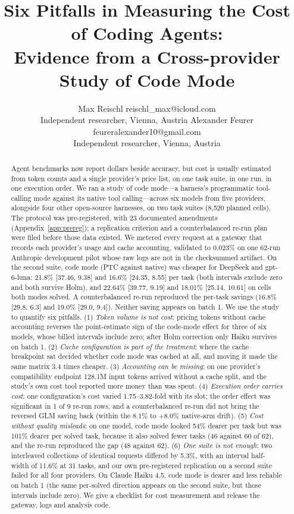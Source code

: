\documentclass[10pt]{article}
\title{Six Pitfalls in Measuring the Cost of Coding Agents:\\
Evidence from a Cross-provider Study of Code Mode}
\author{\name Max Reischl \email reischl\_max@icloud.com \\
      \addr Independent researcher, Vienna, Austria
      \AND
      \name Alexander Feurer \email feureralexander10@gmail.com \\
      \addr Independent researcher, Vienna, Austria}
\newcommand*{\mi}{\textminus}   %
\begin{document}
\maketitle

\begin{abstract}
Agent benchmarks now report dollars beside accuracy, but cost is usually estimated from
token counts and a single provider's price list, on one task suite, in one run, in one execution
order. We ran a study of code mode---a harness's programmatic tool-calling mode against its native
tool calling---across six models from five providers, alongside four other open-source harnesses, on
two task suites (8,520 planned cells). The protocol was pre-registered, with 23 documented amendments
(Appendix~\ref{app:prereg}); a replication criterion and a counterbalanced re-run plan were filed
before those data existed. We metered every request at a gateway that records each provider's usage
and cache accounting, validated to 0.023\% on one 62-run Anthropic development pilot whose raw logs
are not in the checksummed artifact.
On the second suite, code mode (PTC against native) was cheaper for DeepSeek and gpt-6-luna:
\mi{}21.8\% [\mi{}37.46, \mi{}9.38] and \mi{}16.6\% [\mi{}24.35, \mi{}8.55] per task
(both intervals exclude zero and both survive Holm), and \mi{}22.64\% [\mi{}39.77, \mi{}9.19] and
\mi{}18.01\% [\mi{}25.14, \mi{}10.61] on cells both modes solved. A counterbalanced re-run
reproduced the per-task savings (\mi{}16.8\% [\mi{}29.8, \mi{}6.3] and \mi{}19.0\% [\mi{}29.0, \mi{}9.4]).
Neither saving appears on batch 1. We use the study to quantify six
pitfalls. (1) \emph{Token volume is not cost}: pricing tokens without cache accounting reverses the
point-estimate sign of the code-mode effect for three of six models, whose billed intervals include zero; after Holm correction only Haiku survives on batch 1. (2) \emph{Cache configuration is part of the
treatment}: where the cache breakpoint sat decided whether code mode was cached at all, and moving it
made the same matrix 3.4 times cheaper. (3) \emph{Accounting can be missing}: on one provider's
compatibility endpoint 128.1M input tokens arrived without a cache split, and the study's own cost tool
reported more money than was spent. (4) \emph{Execution order carries cost}: one configuration's cost
varied 1.75--3.82-fold with its slot; the order effect was significant in 1 of 9 re-run rows, and a
counterbalanced re-run did not bring the reversed GLM saving back (within the \mi{}8.1\% to +8.0\% native-arm drift).
(5) \emph{Cost without quality misleads}: on one model, code mode looked 54\% dearer per task but was
101\% dearer per solved task, because it also solved fewer tasks (46 against 60 of 62), and the re-run
reproduced the gap (48 against 62). (6) \emph{One suite is not enough}: two interleaved collections of
identical requests differed by \mi{}5.3\%, with an interval half-width of 11.6\% at 31 tasks, and our
own pre-registered replication on a second suite failed for all four providers. On Claude Haiku 4.5, code mode
is dearer and less reliable on batch 1 (the same per-solved direction appears on the second suite, but those intervals include zero). We give a checklist for cost measurement and release the gateway,
logs and analysis code.
\end{abstract}
\end{document}
